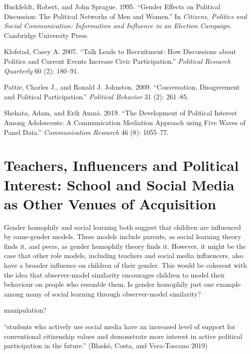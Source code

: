 \documentclass[
  letterpaper,
  DIV=11,
  numbers=noendperiod]{scrreprt}
\newlength{\cslhangindent}
\newlength{\cslentryspacingunit} %
\newenvironment{CSLReferences}[2] %
 {%
  \setlength{\parindent}{0pt}
  \ifodd #1
  \let\oldpar\par
  \def\par{\hangindent=\cslhangindent\oldpar}
  \fi
  \setlength{\parskip}{#2\cslentryspacingunit}
 }%
 {}
\begin{document}
\hypertarget{refs-5}{}
\begin{CSLReferences}{1}{0}
\leavevmode{}%
Huckfeldt, Robert, and John Sprague. 1995. {``{Gender Effects on
Political Discussion: The Political Networks of Men and Women}.''} In
\emph{{Citizens, Politics and Social Communication: Information and
Influence in an Election Campaign}}. Cambridge University Press.

\leavevmode{}%
Klofstad, Casey A. 2007. {``{Talk Leads to Recruitment: How Discussions
about Politics and Current Events Increase Civic Participation}.''}
\emph{Political Research Quarterly} 60 (2): 180--91.

\leavevmode{}%
Pattie, Charles J., and Ronald J. Johnston. 2009. {``{Conversation,
Disagreement and Political Participation}.''} \emph{Political Behavior}
31 (2): 261--85.

\leavevmode{}%
Shehata, Adam, and Erik Amnå. 2019. {``{The Development of Political
Interest Among Adolescents: A Communication Mediation Approach using
Five Waves of Panel Data}.''} \emph{Communication Research} 46 (8):
1055--77.

\end{CSLReferences}


\hypertarget{sec-chap6}{%
\chapter{Teachers, Influencers and Political Interest: School and Social
Media as Other Venues of Acquisition}\label{sec-chap6}}

Gender homophily and social learning both suggest that children are
influenced by same-gender models. These models include parents, as
social learning theory finds it, and peers, as gender homophily theory
finds it. However, it might be the case that other role models,
including teachers and social media influencers, also have a broader
influence on children of their gender. This would be coherent with the
idea that observer-model similarity encourages children to model their
behaviour on people who resemble them. Is gender homophily just one
example among many of social learning through observer-model similarity?

manipulation?

``students who actively use social media have an increased level of
support for conventional citizenship values and demonstrate more
interest in active political participation in the future.'' (Blaskó,
Costa, and Vera-Toscano 2019)
\end{document}
